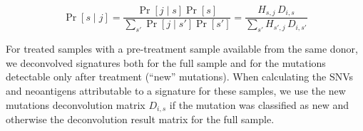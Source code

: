 \[
\Pr[s \mid j] = \frac{\Pr[j \mid s] \Pr[s]}{\sum_{s'}{\Pr[j \mid s']\Pr[s']}} = \frac{H_{s,j} \, D_{i,s}}{\sum_{s'}{H_{s',j} \, D_{i,s'}}}
\]

For treated samples with a pre-treatment sample available from the same donor, we deconvolved signatures both for the full sample and for the mutations detectable only after treatment (``new'' mutations). When calculating the SNVs and neoantigens attributable to a signature for these samples, we use the new mutations deconvolution matrix $D_{i,s}$ if the mutation was classified as new and otherwise the deconvolution result matrix for the full sample.
